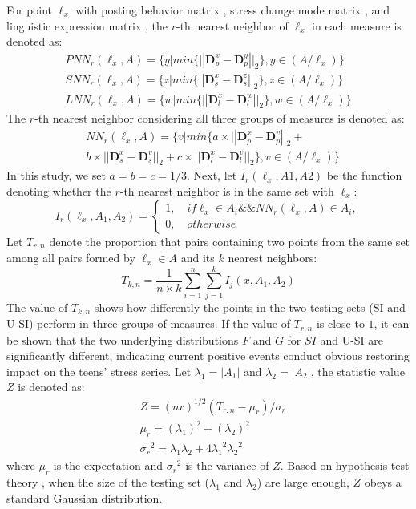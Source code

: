 For point $\ell_x$ with posting behavior matrix , stress change mode matrix ,
and linguistic expression matrix ,
the $r$-th nearest neighbor of $\ell_x$ in each measure is denoted as: 
\begin{equation}
\begin{aligned}
& PNN_r(\ell_x,A)
= \{y | min\{||\textbf{D}_p^x-\textbf{D}_p^y ||_2\}, y\in(A/\ell_x)\} &\\
& SNN_r(\ell_x,A)
= \{z | min\{||\textbf{D}_s^x-\textbf{D}_s^z ||_2\}, z\in(A/\ell_x)\} \\
& LNN_r(\ell_x,A)
= \{w | min\{||\textbf{D}_l^x-\textbf{D}_l^w ||_2\}, w\in(A/\ell_x)\} &
 \end{aligned}
 \end{equation}
The $r$-th nearest neighbor considering all three groups of measures is denoted as:
\begin{align}
&NN_r(\ell_x,A) = \{v | min\{a \times ||\textbf{D}_p^x-\textbf{D}_p^v||_2+\\
&b \times ||\textbf{D}_s^x-\textbf{D}_s^v||_2+
c \times ||\textbf{D}_l^x-\textbf{D}_l^v||_2\}, v\in(A/\ell_x) \}
\end{align}
In this study, we set $a = b = c = 1/3$.
Next, let $I_r(\ell_x,A1,A2)$ be the function denoting whether the $r$-th nearest neighbor is in the same set with $\ell_x$:
\begin{equation}
I_r(\ell_x,A_1,A_2) =
\left\{ \begin{array}{ll}
1, \quad if \ell_x \in A_i  \&\& NN_r(\ell_x,A)\in A_i,\\
0, \quad otherwise
\end{array}
\right.
\end{equation}
Let $T_{r,n}$ denote the proportion that pairs containing two points from the same set among all pairs formed by $\ell_x \in A$
and its $k$ nearest neighbors:
\begin{equation}
T_{k,n}= \frac{1}{n\times k}\sum_{i=1}^{n}\sum_{j=1}^{k}I_j(x,A_1,A_2)
\end{equation}
The value of $T_{k,n}$ shows how differently the points in the two testing sets (SI and U-SI) perform in three groups of measures.
If the value of $T_{r,n}$ is close to $1$,
it can be shown that the two underlying distributions $F$ and $G$ for $SI$ and U-SI are significantly different,
indicating current positive events conduct obvious restoring impact on the teens' stress series.
Let $\lambda_1=|A_1|$ and $\lambda_2=|A_2|$, the statistic value $Z$ is denoted as:
\begin{align}
&Z=(nr)^{1/2}(T_{r,n}-\mu_{r})/\sigma_{r}\\
&\mu_r=(\lambda_1)^2+(\lambda_2)^2\\
&{\sigma_r}^2=\lambda_1\lambda_2+4{\lambda_1}^2{\lambda_2}^2
\end{align}
where $\mu_r$ is the expectation and ${\sigma_r}^2$ is the variance of $Z$.
Based on hypothesis test theory \cite{Johnson2012Applied},
when the size of the testing set ($\lambda_1$ and $\lambda_2$) are large enough,
$Z$ obeys a standard Gaussian distribution.

